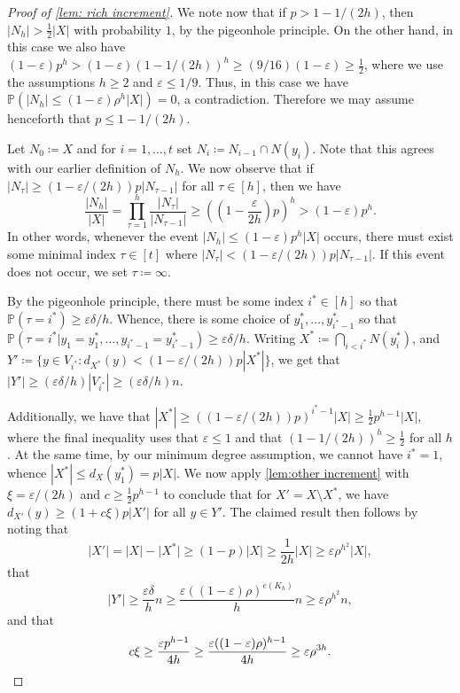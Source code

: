 \documentclass[11pt]{article}
\numberwithin{equation}{section}
\theoremstyle{plain}
\theoremstyle{remark}
\newcommand{\eps}{\ensuremath{\varepsilon}}
\newcommand\ab[1]{\lvert #1 \rvert}
\renewcommand{\P}{\mathbb{P}}
\begin{document}
\begin{proof}[Proof of \cref{lem: rich increment}]
We note now that if $p > 1-1/(2h)$, then $\ab{N_h} > \frac 12 \ab X$ with probability $1$, by the pigeonhole principle. On the other hand, in this case we also have $(1-\eps)p^h > (1-\eps)(1-1/(2h))^h \geq (9/16)(1-\eps)\geq\frac 12$, where we use the assumptions $h \geq 2$ and $\eps \leq 1/9$. Thus, in this case we have $\P(\ab{N_h} \leq (1-\eps) \rho^h \ab X) = 0$, a contradiction. Therefore we may assume henceforth that $p \leq 1-1/(2h)$.

Let $N_0\coloneqq X$ and for $i =1,\dots ,t$ set $N_i\coloneqq N_{i-1}\cap N(y_i)$. Note that this agrees with our earlier definition of $N_h$. We now observe that if $\ab{N_\tau} \geq (1-\eps/(2h)) p \ab{N_{\tau-1}}$ for all $\tau \in [h]$, then we have
\[
\frac{\ab{N_h}}{\ab X} = \prod_{\tau=1}^h \frac{\ab{N_\tau}}{\ab{N_{\tau-1}}} \geq \left( \left( 1- \frac{\eps}{2h}\right) p\right)^h > (1-\eps) p^h.
\]
In other words, whenever the event $\ab{N_h}\leq (1-\eps)p^h \ab X$ occurs, there 
must exist some minimal index $\tau\in [t]$ where $|N_\tau|<(1-\eps/(2h))p|N_{\tau-1}|$. If this event does not occur, we set $\tau\coloneqq \infty$.

By the pigeonhole principle, there must be some index $i^*\in [h]$ so that $\P(\tau = i^*)\ge \eps\delta/h$. Whence, there is some choice of $y_1^*,\dots,y_{i^*-1}^*$ so that $\P(\tau = i^*|y_1=y_1^*,\dots,y_{i^*-1}=y_{i^*-1}^*) \ge \eps\delta/h $. Writing $X^*\coloneqq  \bigcap_{i<i^*}N(y_i^*)$, and $Y' \coloneqq  \{y\in V_{i^*}: d_{X^*}(y)<(1-\eps/(2h))p|X^*|\}$, we get that $|Y'| \ge (\eps\delta/h)|V_{i^*}|\ge (\eps \delta/h)n$.

Additionally, we have that $|X^*|\ge ((1-\eps/(2h))p)^{i^*-1}|X|\ge \frac 12 p^{h-1}|X|$, where the final inequality uses that $\eps \leq 1$ and that $(1-1/(2h))^h \geq \frac 12$ for all $h$. At the same time, by our minimum degree assumption, we cannot have $i^*=1$, whence $|X^*|\le d_X(y_1^*) = p|X|$. We now apply \cref{lem:other increment} with $\xi = \eps/(2h)$ and $c \geq \frac 12 p^{h-1}$ to conclude that for $X' = X \setminus X^*$, we have $d_{X'}(y) \geq (1+c\xi)p \ab{X'}$ for all $y \in Y'$. The claimed result then follows by noting that
\[
\ab {X'} = \ab X - \ab{X^*} \geq (1-p)\ab X \geq \frac 1{2h} \ab X \geq \eps \rho^{h^2} \ab X,
\]
that
\[
\ab{Y'} \geq \frac{\eps \delta}{h}n \geq \frac{\eps((1-\eps)\rho)^{e(K_h)}}{h}n \geq \eps \rho^{h^2}n,
\]
and that
\[
c \xi \geq \frac{\eps p^{h-1}}{4h} \geq \frac{\eps((1-\eps)\rho)^{h-1}}{4h} \geq \eps \rho^{3h}.\qedhere
\]
\end{proof}
\end{document}

